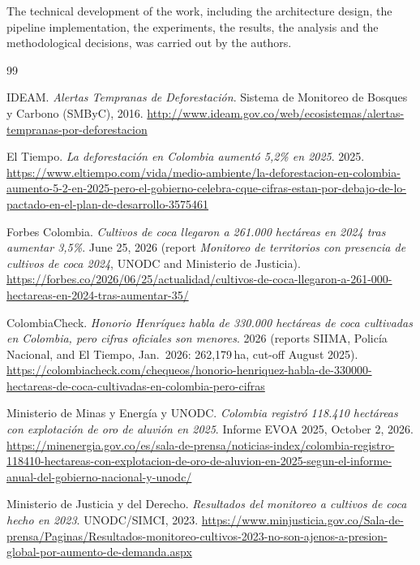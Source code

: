 \documentclass{article}
\begin{document}
The technical development of the work, including the architecture design, the pipeline implementation, the experiments, the results, the analysis and the methodological decisions, was carried out by the authors.

\begin{thebibliography}{99}

IDEAM. \textit{Alertas Tempranas de Deforestación}. Sistema de Monitoreo de
Bosques y Carbono (SMByC), 2016.
\url{http://www.ideam.gov.co/web/ecosistemas/alertas-tempranas-por-deforestacion}

El Tiempo. \textit{La deforestación en Colombia aumentó 5,2\% en 2025}. 2025.
\url{https://www.eltiempo.com/vida/medio-ambiente/la-deforestacion-en-colombia-aumento-5-2-en-2025-pero-el-gobierno-celebra-cque-cifras-estan-por-debajo-de-lo-pactado-en-el-plan-de-desarrollo-3575461}

Forbes Colombia. \textit{Cultivos de coca llegaron a 261.000 hect\'areas en 2024
tras aumentar 3,5\%}. June 25, 2026 (report \textit{Monitoreo de territorios con
presencia de cultivos de coca 2024}, UNODC and Ministerio de Justicia).
\url{https://forbes.co/2026/06/25/actualidad/cultivos-de-coca-llegaron-a-261-000-hectareas-en-2024-tras-aumentar-35/}

ColombiaCheck. \textit{Honorio Henr\'iquez habla de 330.000 hect\'areas de coca
cultivadas en Colombia, pero cifras oficiales son menores}. 2026 (reports SIIMA,
Polic\'ia Nacional, and El Tiempo, Jan.\ 2026: 262,179\,ha, cut-off August 2025).
\url{https://colombiacheck.com/chequeos/honorio-henriquez-habla-de-330000-hectareas-de-coca-cultivadas-en-colombia-pero-cifras}

Ministerio de Minas y Energ\'ia y UNODC. \textit{Colombia registr\'o 118.410
hect\'areas con explotaci\'on de oro de aluvi\'on en 2025}. Informe EVOA 2025,
October 2, 2026.
\url{https://minenergia.gov.co/es/sala-de-prensa/noticias-index/colombia-registro-118410-hectareas-con-explotacion-de-oro-de-aluvion-en-2025-segun-el-informe-anual-del-gobierno-nacional-y-unodc/}

Ministerio de Justicia y del Derecho. \textit{Resultados del monitoreo a
cultivos de coca hecho en 2023}. UNODC/SIMCI, 2023.
\url{https://www.minjusticia.gov.co/Sala-de-prensa/Paginas/Resultados-monitoreo-cultivos-2023-no-son-ajenos-a-presion-global-por-aumento-de-demanda.aspx}


\end{thebibliography}
\end{document}

